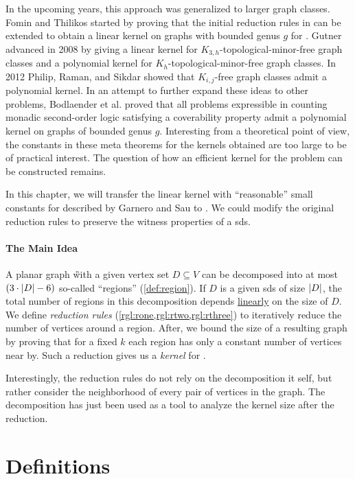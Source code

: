 In the upcoming years, this approach was generalized to larger graph classes. 
Fomin and Thilikos \cite{Fomin2004} started by proving that the initial reduction rules in \cite{Alber2004} can be extended to obtain a linear kernel on graphs with bounded genus $g$ for \dom.
Gutner \cite{Gutner2009} advanced in 2008 by giving a linear kernel for $K_{3,h}$-topological-minor-free graph classes and a polynomial kernel for $K_h$-topological-minor-free graph classes. 
In 2012 Philip, Raman, and Sikdar \cite{Philip2012} showed that $K_{i,j}$-free graph classes admit a polynomial kernel. 
In an attempt to further expand these ideas to other problems, Bodlaender et al. \cite{Bodlaender2016} proved that all problems expressible in counting monadic second-order logic satisfying a coverability property admit a polynomial kernel on graphs of bounded genus $g$. 
Interesting from a theoretical point of view, the constants in these meta theorems for the kernels obtained are too large to be of practical interest. 
The question of how an efficient kernel for the \psdom problem can be constructed remains. 

In this chapter, we will transfer the linear kernel with ``reasonable'' small constants for \ptdom described by Garnero and Sau \cite[arXiv v2]{Garnero2018} to \psdom. 
We could modify the original reduction rules to preserve the witness properties of a sds. 

 \paragraph{The Main Idea} A planar graph \G with a given vertex set $D \subseteq V$ can be decomposed into at most $(3 \cdot \abs{D}-6)$ so-called ``regions'' (\cref{def:region}). 
 If $D$ is a given sds of size $\abs{D}$, the total number of regions in this decomposition depends \underline{linearly} on the size of $D$. 
 We define \textit{reduction rules} (\cref{rgl:rone,rgl:rtwo,rgl:rthree}) to iteratively reduce the number of vertices around a region.
 After, we bound the size of a resulting graph by proving that for a fixed $k$ each region has only a constant number of vertices near by. 
Such a reduction gives us a \textit{kernel} for \psdom.

Interestingly, the reduction rules do not rely on the decomposition it self, but rather consider the neighborhood of every pair of vertices in the graph. 
The decomposition has just been used as a tool to analyze the kernel size after the reduction.

\section{Definitions}

